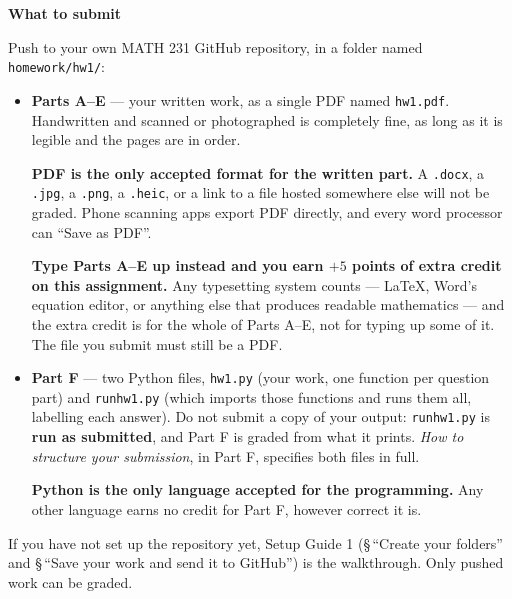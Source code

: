 \documentclass[11pt]{article}
\theoremstyle{definition}
\newenvironment{callout}[1]
  {\par\medskip\needspace{5\baselineskip}%
   \begin{lrbox}{\qcbox}%
   \begin{minipage}{\dimexpr\textwidth-2\fboxsep-4pt}%
   \setlength{\parskip}{0.4em}%
   \textbf{\sffamily\color{RoyalBlue}#1}\par}
  {\end{minipage}\end{lrbox}%
   \begin{center}\colorbox{softbg}{\usebox{\qcbox}}\end{center}\medskip}
\begin{document}
\begin{callout}{What to submit}
Push to your own MATH 231 GitHub repository, in a folder named
\texttt{homework/hw1/}:

\begin{itemize}[leftmargin=1.4em,itemsep=7pt,topsep=3pt]
  \item \textbf{Parts A--E} --- your written work, as a single PDF named
        \texttt{hw1.pdf}. Handwritten and scanned or photographed is completely
        fine, as long as it is legible and the pages are in order.

        \textbf{PDF is the only accepted format for the written part.} A
        \texttt{.docx}, a \texttt{.jpg}, a \texttt{.png}, a \texttt{.heic}, or a
        link to a file hosted somewhere else will not be graded. Phone scanning
        apps export PDF directly, and every word processor can ``Save as PDF''.

        \textbf{Type Parts A--E up instead and you earn $+5$ points of extra
        credit on this assignment.} Any typesetting system counts --- \LaTeX,
        Word's equation editor, or anything else that produces readable
        mathematics --- and the extra credit is for the whole of Parts A--E, not
        for typing up some of it. The file you submit must still be a PDF.

  \item \textbf{Part F} --- two Python files, \texttt{hw1.py} (your work, one
        function per question part) and \texttt{runhw1.py} (which imports those
        functions and runs them all, labelling each answer). Do not submit a copy
        of your output: \texttt{runhw1.py} is \textbf{run as submitted}, and Part
        F is graded from what it prints. \emph{How to structure your submission},
        in Part F, specifies both files in full.

        \textbf{Python is the only language accepted for the programming.} Any
        other language earns no credit for Part F, however correct it is.
\end{itemize}

If you have not set up the repository yet, Setup Guide 1 (\S\,``Create your
folders'' and \S\,``Save your work and send it to GitHub'') is the walkthrough.
Only pushed work can be graded.
\end{callout}
\end{document}
